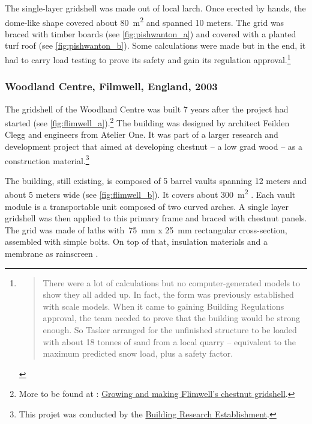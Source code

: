 The single-layer gridshell was made out of local larch. Once erected by hands, the dome-like shape covered about \SI{80}{m^2} and spanned 10 meters. The grid was braced with timber boards (see \cref{fig:pishwanton_a}) and covered with a planted turf roof (see \cref{fig:pishwanton_b}). Some calculations were made but in the end, it had to carry load testing to prove its safety and gain its regulation approval.\footnote{\blockcquote[]{bdonline2002}{There were a lot of calculations but no computer-generated models to show they all added up. In fact, the form was previously established with scale models. When it came to gaining Building Regulations approval, the team needed to prove that the building would be strong enough. So Tasker arranged for the unfinished structure to be loaded with about 18 tonnes of sand from a local quarry – equivalent to the maximum predicted snow load, plus a safety factor.}}

\subsubsection{Woodland Centre, Filmwell, England, 2003}
The gridshell of the Woodland Centre was built 7 years after the project had started (see \cref{fig:flimwell_a}).\footnote{More to be found at : \href{http://www.fourthdoor.org/annular/?page_id=441}{Growing and making Flimwell’s chestnut gridshell}.} The building was designed by architect Feilden Clegg and engineers from Atelier One. It was part of a larger research and development project that aimed at developing chestnut -- a low grad wood -- as a construction material.\footnote{This projet was conducted by the \href{http://www.bre.co.uk/}{Building Research Establishment}.}

The building, still existing, is composed of 5 barrel vaults spanning 12 meters and about 5 meters wide (see \cref{fig:flimwell_b}). It covers about \SI{300}{m^2} \cite{Lowenstein2004}. Each vault module is a transportable unit composed of two curved arches. A single layer gridshell was then applied to this primary frame and braced with chestnut panels. The grid was made of laths with~\SI{75}{mm} x \SI{25}{mm} rectangular cross-section, assembled with simple bolts. On top of that, insulation materials and a membrane as rainscreen \cite{FourthDoor2003}.



